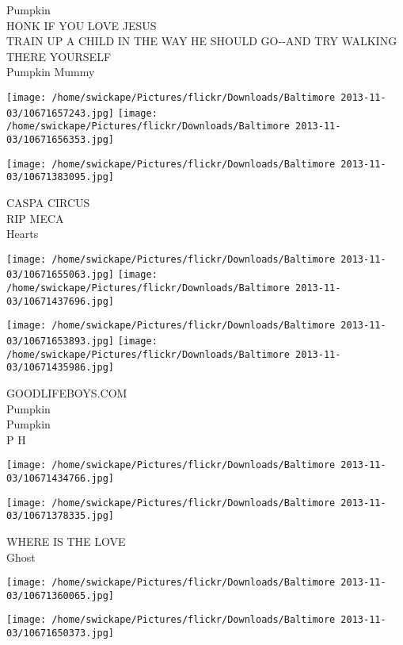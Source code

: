 \documentclass[10pt,letterpaper]{article}
\begin{document}
Pumpkin\\
HONK IF YOU LOVE JESUS\\
TRAIN UP A CHILD IN THE WAY HE SHOULD GO{-}{-}AND TRY WALKING THERE YOURSELF\\
Pumpkin Mummy\\
\pagebreak

\texttt{[image: /home/swickape/Pictures/flickr/Downloads/Baltimore 2013-11-03/10671657243.jpg]}
\texttt{[image: /home/swickape/Pictures/flickr/Downloads/Baltimore 2013-11-03/10671656353.jpg]}

\vspace{0.25in}
\texttt{[image: /home/swickape/Pictures/flickr/Downloads/Baltimore 2013-11-03/10671383095.jpg]}

CASPA CIRCUS\\
RIP MECA\\
Hearts\\
\pagebreak

\texttt{[image: /home/swickape/Pictures/flickr/Downloads/Baltimore 2013-11-03/10671655063.jpg]}
\texttt{[image: /home/swickape/Pictures/flickr/Downloads/Baltimore 2013-11-03/10671437696.jpg]}

\texttt{[image: /home/swickape/Pictures/flickr/Downloads/Baltimore 2013-11-03/10671653893.jpg]}
\texttt{[image: /home/swickape/Pictures/flickr/Downloads/Baltimore 2013-11-03/10671435986.jpg]}

GOODLIFEBOYS.COM\\
Pumpkin\\
Pumpkin\\
P H\\
\pagebreak

\texttt{[image: /home/swickape/Pictures/flickr/Downloads/Baltimore 2013-11-03/10671434766.jpg]}

\vspace{0.25in}
\texttt{[image: /home/swickape/Pictures/flickr/Downloads/Baltimore 2013-11-03/10671378335.jpg]}

WHERE IS THE LOVE\\
Ghost\\
\pagebreak

\texttt{[image: /home/swickape/Pictures/flickr/Downloads/Baltimore 2013-11-03/10671360065.jpg]}

\vspace{0.25in}
\texttt{[image: /home/swickape/Pictures/flickr/Downloads/Baltimore 2013-11-03/10671650373.jpg]}
\end{document}
